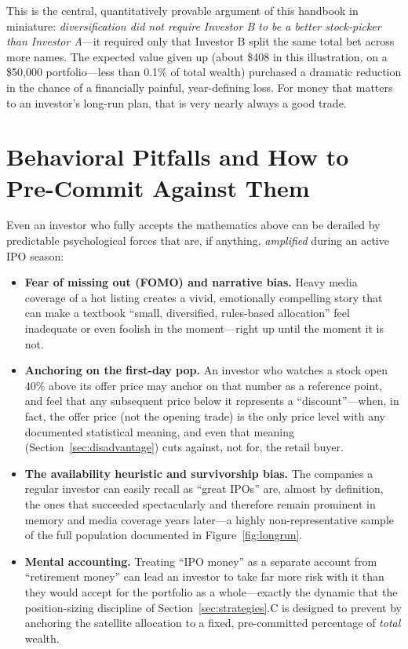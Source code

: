 \documentclass[conference]{IEEEtran}
\begin{document}
This is the central, quantitatively provable argument of this handbook in miniature: \emph{diversification did not require Investor B to be a better stock-picker than Investor A}---it required only that Investor B split the same total bet across more names. The expected value given up (about \$408 in this illustration, on a \$50{,}000 portfolio---less than 0.1\% of total wealth) purchased a dramatic reduction in the chance of a financially painful, year-defining loss. For money that matters to an investor's long-run plan, that is very nearly always a good trade.

\section{Behavioral Pitfalls and How to Pre-Commit Against Them}
\label{sec:behavioral}

Even an investor who fully accepts the mathematics above can be derailed by predictable psychological forces that are, if anything, \emph{amplified} during an active IPO season:

\begin{itemize}
    \item \textbf{Fear of missing out (FOMO) and narrative bias.} Heavy media coverage of a hot listing creates a vivid, emotionally compelling story that can make a textbook ``small, diversified, rules-based allocation'' feel inadequate or even foolish in the moment---right up until the moment it is not.
    \item \textbf{Anchoring on the first-day pop.} An investor who watches a stock open 40\% above its offer price may anchor on that number as a reference point, and feel that any subsequent price below it represents a ``discount''---when, in fact, the offer price (not the opening trade) is the only price level with any documented statistical meaning, and even that meaning (Section~\ref{sec:disadvantage}) cuts against, not for, the retail buyer.
    \item \textbf{The availability heuristic and survivorship bias.} The companies a regular investor can easily recall as ``great IPOs'' are, almost by definition, the ones that succeeded spectacularly and therefore remain prominent in memory and media coverage years later---a highly non-representative sample of the full population documented in Figure~\ref{fig:longrun}.
    \item \textbf{Mental accounting.} Treating ``IPO money'' as a separate account from ``retirement money'' \cite{thaler1999} can lead an investor to take far more risk with it than they would accept for the portfolio as a whole---exactly the dynamic that the position-sizing discipline of Section~\ref{sec:strategies}.C is designed to prevent by anchoring the satellite allocation to a fixed, pre-committed percentage of \emph{total} wealth.
\end{itemize}
\end{document}

